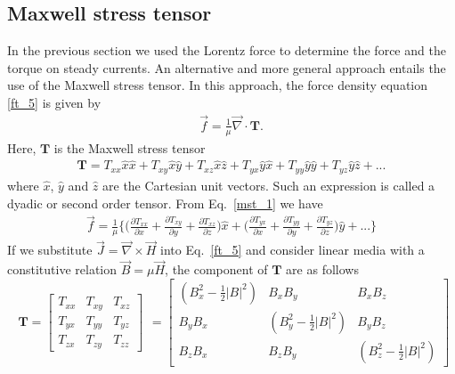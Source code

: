 \documentclass[11pt,a4paper,oneside]{book}
\numberwithin{equation}{section}
\newcommand{\abs}[1]{\left|#1\right|}
\theoremstyle{it}
\theoremstyle{definition}
\begin{document}
\subsection{Maxwell stress tensor}
In the previous section we used the Lorentz force to determine the force and the torque on steady currents. An alternative and more general approach entails the use of the Maxwell stress tensor. In this approach, the force density equation \ref{ft_5} is given by
\begin{equation}\label{mst_1}
	\begin{aligned}
		\vec{f}=\frac{1}{\mu}\vec{\nabla}\cdot\mathbf{T}.
	\end{aligned}
\end{equation}
Here, $\mathbf{T}$ is the Maxwell stress tensor
\begin{equation}\label{mst_2}
	\begin{aligned}
		\mathbf{T}=T_{xx}\hat{x}\hat{x}+T_{xy}\hat{x}\hat{y}+T_{xz}\hat{x}\hat{z}+T_{yx}\hat{y}\hat{x}+T_{yy}\hat{y}\hat{y}+T_{yz}\hat{y}\hat{z}+...
	\end{aligned}
\end{equation}
where $\hat{x}$, $\hat{y}$ and $\hat{z}$ are the Cartesian unit vectors. Such an expression is called a dyadic or second order tensor. From Eq.~\eqref{mst_1} we have
\begin{equation}\label{mst_3}
	\begin{aligned}
		\vec{f}=\frac{1}{\mu}\Biggl\{\Bigg(\frac{\partial T_{xx}}{\partial x}+\frac{\partial T_{xy}}{\partial y}+\frac{\partial T_{xz}}{\partial z}\Bigg)\hat{x}+\Bigg(\frac{\partial T_{yx}}{\partial x}+\frac{\partial T_{yy}}{\partial y}+\frac{\partial T_{yz}}{\partial z}\Bigg)\hat{y}+... \Biggr\}
	\end{aligned}
\end{equation}
If we substitute $\vec{J}=\vec{\nabla}\times\vec{H}$ into Eq.~\eqref{ft_5} and consider linear media with a constitutive relation $\vec{B}=\mu\vec{H}$, the component of $\mathbf{T}$ are as follows
\begin{equation}\label{mst_4}
	\begin{aligned}
		\mathbf{T}=\begin{bmatrix} T_{xx} & T_{xy} & T_{xz} \\ T_{yx} & T_{yy} & T_{yz} \\ T_{zx} & T_{zy} & T_{zz}	\end{bmatrix}
	\end{aligned} = \begin{bmatrix} (B_x^2-\frac{1}{2}\abs{B}^2) & B_xB_y & B_xB_z \\ B_yB_x & (B_y^2-\frac{1}{2}\abs{B}^2) & B_yB_z \\ B_zB_x & B_zB_y &(B_z^2-\frac{1}{2}\abs{B}^2)	\end{bmatrix}
\end{equation}
\end{document}
